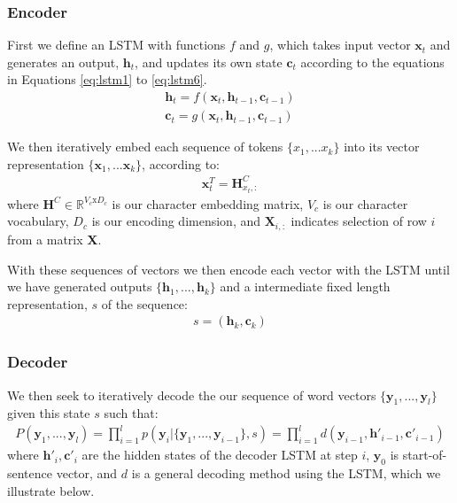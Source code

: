 \subsubsection{Encoder}

First we define an LSTM with functions $f$ and $g$, which takes input vector $\textbf{x}_t$ and generates an output, $\textbf{h}_t$, and updates its own state $\textbf{c}_t$ according to the equations in Equations \ref{eq:lstm1} to \ref{eq:lstm6}.
\begin{align}
    \textbf{h}_t = f(\textbf{x}_t, \textbf{h}_{t-1}, \textbf{c}_{t-1}) \label{eq:s2sh}\\
    \textbf{c}_t = g(\textbf{x}_t, \textbf{h}_{t-1}, \textbf{c}_{t-1}) \label{eq:s2sc}
\end{align}

We then iteratively embed each sequence of tokens $\{x_1,...x_k\}$ into its vector representation $\{\textbf{x}_1,...\textbf{x}_k\}$, according to:
\begin{align}
    \textbf{x}^T_t = \mathbf{H}^C_{x_t,:}
\end{align}
where 
$\textbf{H}^C \in \mathbb{R}^{V_c\text{x}D_c}$ is our character embedding matrix, 
$V_c$ is our character vocabulary, 
$D_c$ is our encoding dimension, 
and $\textbf{X}_{i,:}$ indicates selection of row $i$ from a matrix \textbf{X}.

With these sequences of vectors we then encode each vector with the LSTM until we have generated outputs $\{\textbf{h}_1,...,\textbf{h}_k\}$ and a intermediate fixed length representation, $s$ of the sequence: 
\begin{align}
     s = (\textbf{h}_k, \textbf{c}_k) \label{eq:s2s_state}
\end{align}

\subsubsection{Decoder}

We then seek to iteratively decode the our sequence of word vectors $\{\textbf{y}_1,..., \textbf{y}_l\}$ given this state $s$ such that:
\begin{align}
    P(\textbf{y}_1,...,\textbf{y}_l) = \prod_{i=1}^l p(\textbf{y}_i| \{\textbf{y}_1,...,\textbf{y}_{i-1}\}, s)  = \prod_{i=1}^ld(\mathbf{y}_{i-1}, \mathbf{h}'_{i-1},\mathbf{c}'_{i-1} )
\end{align}
where $\mathbf{h}'_{i},\mathbf{c}'_{i} $ are the hidden states of the decoder LSTM at step $i$, $\mathbf{y}_0$ is start-of-sentence vector, and $d$ is a general decoding method using the LSTM, which we illustrate below.

